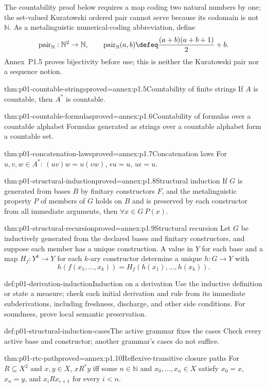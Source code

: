 The countability proof below requires a map coding two natural numbers by one;
the set-valued Kuratowski ordered pair cannot serve because its codomain is not
\(\mathbb N\).  As a metalinguistic numerical-coding abbreviation, define
\[
 \operatorname{pair}_{\mathbb N}:\mathbb N^2\to\mathbb N,
 \qquad
 \operatorname{pair}_{\mathbb N}(a,b)
 \defeq\frac{(a+b)(a+b+1)}2+b.
\]
Annex~P1.5 proves bijectivity before use; this is neither the Kuratowski pair
nor a sequence notion.
\begin{hblemma}{thm:p01-countable-strings}{proved=annex:p1.5}{Countability of finite strings}
If \(A\) is countable, then \(A^*\) is countable.
\end{hblemma}
\begin{hbcorollary}{thm:p01-countable-formulas}{proved=annex:p1.6}{Countability of formulas over a countable alphabet}
Formulas generated as strings over a countable alphabet form a countable set.
\end{hbcorollary}
\begin{hblemma}{thm:p01-concatenation-laws}{proved=annex:p1.7}{Concatenation laws}
For \(u,v,w\in A^*\): \((uv)w=u(vw)\), \(\epsilon u=u\), \(u\epsilon=u\).
\end{hblemma}
\begin{hbtheorem}{thm:p01-structural-induction}{proved=annex:p1.8}{Structural induction}
If \(G\) is generated from bases \(B\) by finitary constructors \(F\), and
the metalinguistic property \(P\) of members of \(G\) holds on \(B\) and is
preserved by each constructor from all immediate arguments, then
\(\forall x\in G\ P(x)\).
\end{hbtheorem}
\begin{hbtheorem}{thm:p01-structural-recursion}{proved=annex:p1.9}{Structural recursion}
Let \(G\) be inductively generated from the declared bases and finitary
constructors, and suppose each member has a unique construction.  A value in
\(Y\) for each base and a map \(H_f:Y^k\to Y\) for each \(k\)-ary constructor
determine a unique \(h:G\to Y\) with
\[
h(f(x_1,\ldots,x_k))=H_f(h(x_1),\ldots,h(x_k)).
\]
\end{hbtheorem}
\begin{hbmethod}{def:p01-derivation-induction}{Induction on a derivation}
Use the inductive definition or state a measure; check each initial derivation
and rule from its immediate subderivations, including freshness, discharge,
and other side conditions.  For soundness, prove local semantic preservation.
\end{hbmethod}
\begin{hbwarning}{def:p01-structural-induction-cases}{The active grammar fixes the cases}
Check every active base and constructor; another grammar's cases do not suffice.
\end{hbwarning}
\begin{hblemma}{thm:p01-rtc-path}{proved=annex:p1.10}{Reflexive-transitive closure paths}
For \(R\subseteq X^2\) and \(x,y\in X\), \(xR^*y\) iff some
\(n\in\mathbb N\) and \(x_0,\ldots,x_n\in X\) satisfy \(x_0=x\), \(x_n=y\),
and \(x_iRx_{i+1}\) for every \(i<n\).
\end{hblemma}
